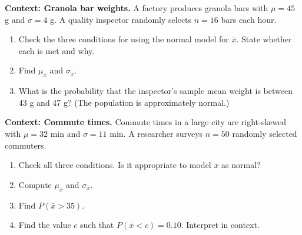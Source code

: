 \documentclass[10pt]{article}
\begin{document}
\namepartnerperiod

\vspace{0.1in}

\begin{tcolorbox}[colback=redbg, colframe=black!40, boxrule=0.6pt, arc=2mm,
    left=3mm, right=3mm, top=2mm, bottom=2mm, title=\textbf{Tier R --- Remediate}]
\textbf{Context: Granola bar weights.}
A factory produces granola bars with $\mu = 45$ g and $\sigma = 4$ g.
A quality inspector randomly selects $n = 16$ bars each hour.

\begin{enumerate}
  \item Check the three conditions for using the normal model for $\bar{x}$. State whether
        each is met and why.
  \item Find $\mu_{\bar{x}}$ and $\sigma_{\bar{x}}$.
        \vspace{0.6in}
  \item What is the probability that the inspector's sample mean weight is between 43 g
        and 47 g? (The population is approximately normal.)
        \vspace{1.0in}
\end{enumerate}
\end{tcolorbox}

\vspace{0.15in}

\begin{tcolorbox}[colback=redbg, colframe=black!40, boxrule=0.6pt, arc=2mm,
    left=3mm, right=3mm, top=2mm, bottom=2mm, title=\textbf{Tier A --- Approaching Proficiency}]
\textbf{Context: Commute times.}
Commute times in a large city are right-skewed with $\mu = 32$ min and $\sigma = 11$ min.
A researcher surveys $n = 50$ randomly selected commuters.

\begin{enumerate}
  \item Check all three conditions. Is it appropriate to model $\bar{x}$ as normal?
  \item Compute $\mu_{\bar{x}}$ and $\sigma_{\bar{x}}$.
        \vspace{0.5in}
  \item Find $P(\bar{x} > 35)$.
        \vspace{1.0in}
  \item Find the value $c$ such that $P(\bar{x} < c) = 0.10$. Interpret in context.
        \vspace{1.0in}
\end{enumerate}
\end{tcolorbox}
\end{document}
